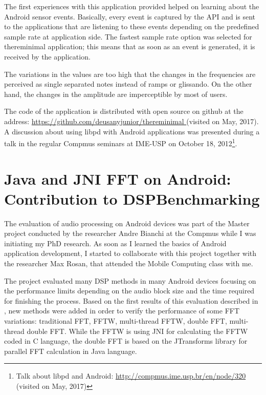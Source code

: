 The first experiences with this application provided helped on learning about the Android sensor events.
Basically, every event is captured by the API and is sent to the applications that are listening to these events depending on the predefined sample rate at application side.
The fastest sample rate option was selected for thereminimal application; this means that as soon as an event is generated, it is received by the application.

The variations in the values are too high that the changes in the frequencies are perceived as single separated notes instead of ramps or glissando.
On the other hand, the changes in the amplitude are imperceptible by most of users.

The code of the application is distributed with open source on github at the address: \url{https://github.com/deusanyjunior/thereminimal
} (visited on May, 2017).
A discussion about using libpd with Android applications was presented during a talk in the regular Compmus seminars at IME-USP on October 18, 2012\footnote{Talk about libpd and Android: \url{http://compmus.ime.usp.br/en/node/320} (visited on May, 2017)}.

\section{Java and JNI FFT on Android: Contribution to DSPBenchmarking}
\label{apesec:appdspbenchmarking}

The evaluation of audio processing on Android devices was part of the Master project conducted by the researcher Andre Bianchi at the Compmus while I was initiating my PhD research.
As soon as I learned the basics of Android application development, I started to collaborate with this project together with the researcher Max Rosan, that attended the Mobile Computing class with me.

The project evaluated many DSP methods in many Android devices focusing on the performance limits depending on the audio block size and the time required for finishing the process.
Based on the first results of this evaluation described in \cite{Bianchi2012ontheperformance}, new methods were added in order to verify the performance of some FFT variations:
traditional FFT, FFTW, multi-thread FFTW, double FFT, multi-thread double FFT.
While the FFTW is using JNI for calculating the FFTW coded in C language, the double FFT is based on the JTransforms library for parallel FFT calculation in Java language.

